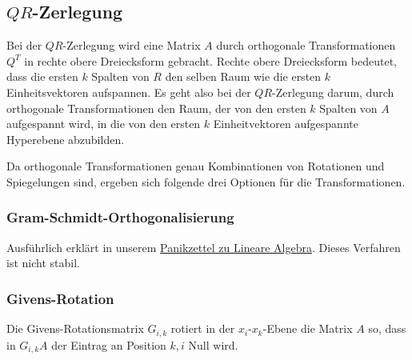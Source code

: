 \documentclass{panikzettel}
\begin{document}
\subsection[QR-Zerlegung]{$QR$-Zerlegung}

Bei der $QR$-Zerlegung wird eine Matrix $A$ durch orthogonale Transformationen $Q^T$ in rechte obere Dreiecksform gebracht. Rechte obere Dreiecksform bedeutet, dass die ersten $k$ Spalten von $R$ den selben Raum wie die ersten $k$ Einheitsvektoren aufspannen. Es geht also bei der $QR$-Zerlegung darum, durch orthogonale Transformationen den Raum, der von den ersten $k$ Spalten von $A$ aufgespannt wird, in die von den ersten $k$ Einheitvektoren aufgespannte Hyperebene abzubilden.

Da orthogonale Transformationen genau Kombinationen von Rotationen und Spiegelungen sind, ergeben sich folgende drei Optionen für die Transformationen.

\subsubsection{Gram-Schmidt-Orthogonalisierung}

Ausführlich erklärt in unserem \href{http://panikzettel.philworld.de/la.pdf#page=20}{Panikzettel zu Lineare Algebra}. Dieses Verfahren ist nicht stabil.

\subsubsection{Givens-Rotation}

Die Givens-Rotationsmatrix $G_{i,k}$ rotiert in der $x_i$-$x_k$-Ebene die Matrix $A$ so, dass in $G_{i,k} A$ der Eintrag an Position $k,i$ Null wird.
\end{document}
